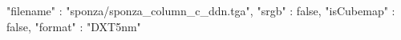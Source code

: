 { 
	"filename" : "sponza/sponza_column_c_ddn.tga", 
	"srgb" : false,
	"isCubemap" : false,
	"format" : "DXT5nm"
}